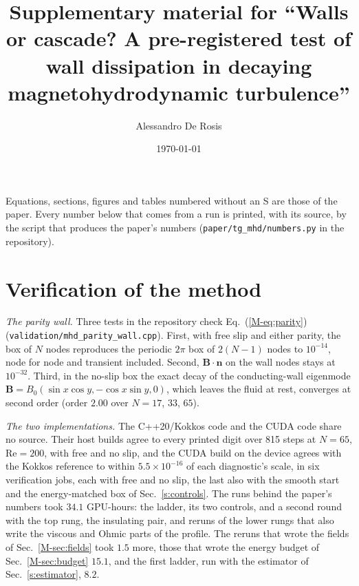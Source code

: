 \documentclass[aip,pop,reprint,amsmath,amssymb,superscriptaddress,floatfix]{revtex4-2}
\newcommand{\Rey}{\mathrm{Re}}
\newcommand{\BB}{\bm{B}}
\begin{document}
\title{Supplementary material for ``Walls or cascade? A pre-registered test of wall
dissipation in decaying magnetohydrodynamic turbulence''}

\author{Alessandro De Rosis}

\date{\today}

\maketitle

\renewcommand{\thesection}{S\arabic{section}}
\renewcommand{\thetable}{S\arabic{table}}
\renewcommand{\thefigure}{S\arabic{figure}}
\renewcommand{\theequation}{S\arabic{equation}}

Equations, sections, figures and tables numbered without an S are those of the
paper. Every number below that comes from a run is printed, with its source, by the
script that produces the paper's numbers (\texttt{paper/tg\_mhd/numbers.py} in the
repository).

\section{Verification of the method}
\label{s:method}

\emph{The parity wall.} Three tests in the repository check Eq.~(\ref{M-eq:parity})
(\texttt{validation/mhd\_parity\_wall.cpp}). First, with free slip and either parity,
the box of $N$ nodes reproduces the periodic $2\pi$ box of $2(N-1)$ nodes to
$10^{-14}$, node for node and transient included. Second, $\BB\cdot\bm{n}$ on the wall
nodes stays at $10^{-32}$. Third, in the no-slip box the exact decay of the
conducting-wall eigenmode $\BB=B_0(\sin x\cos y,-\cos x\sin y,0)$, which leaves the
fluid at rest, converges at second order (order $2.00$ over $N=17$, $33$, $65$).

\emph{The two implementations.} The C++20/Kokkos code and the CUDA code share no
source. Their host builds agree to every printed digit over 815 steps at $N=65$,
$\Rey=200$, with free and no slip, and the CUDA build on the device agrees with the
Kokkos reference to within $5.5\times10^{-16}$ of each diagnostic's scale, in six
verification jobs, each with free and no slip, the last also with the smooth start
and the energy-matched box of Sec.~\ref{s:controls}. The runs behind the paper's numbers
took $34.1$ GPU-hours: the ladder, its two controls, and a second round with the top
rung, the insulating pair, and reruns of the lower rungs that also write the viscous
and Ohmic parts of the profile. The reruns that wrote the fields of
Sec.~\ref{M-sec:fields} took $1.5$ more, those that wrote the energy budget of
Sec.~\ref{M-sec:budget} $15.1$, and the first ladder, run with the estimator of
Sec.~\ref{s:estimator}, $8.2$.
\end{document}
